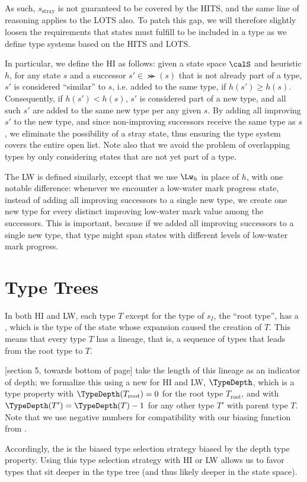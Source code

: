As such, $s_\text{stray}$ is not guaranteed to be covered by the HITS, and the same line of reasoning applies to the LOTS also. To patch this gap, we will therefore slightly loosen the requirements that states must fulfill to be included in a type as we define type systems based on the HITS and LOTS.

In particular, we define the  HI as follows: given a state space $\calS$ and heuristic $h$, for any state $s$ and a successor $s'\in\Succ(s)$ that is not already part of a type, $s'$ is considered ``similar'' to $s$, i.e. added to the same type, if $h(s')\geq h(s)$. Consequently, if $h(s')<h(s)$, $s'$ is considered part of a new type, and all such $s'$ are added to the same new type per any given $s$. By adding all improving $s'$ to the new type, and since non-improving successors receive the same type as $s$, we eliminate the possibility of a stray state, thus ensuring the type system covers the entire open list. Note also that we avoid the problem of overlapping types by only considering states that are not yet part of a type.

The  LW is defined similarly, except that we use $\Lw_h$ in place of $h$, with one notable difference: whenever we encounter a low-water mark progress state, instead of adding all improving successors to a single new type, we create one new type for every distinct improving low-water mark value among the successors. This is important, because if we added all improving successors to a single new type, that type might span states with different levels of low-water mark progress.

\section{Type Trees}
\label{sec:typetrees}

In both HI and LW, each type $T$ except for the type of $s_I$, the ``root type'', has a , which is the type of the state whose expansion caused the creation of $T$. This means that every type $T$ has a lineage, that is, a sequence of types that leads from the root type to $T$.

[section 5, towards bottom of page] take the length of this lineage as an indicator of depth; we formalize this using a new  for HI and LW, $\TypeDepth$, which is a type property with $\TypeDepth(T_\text{root})=0$ for the root type $T_\text{root}$, and with $\TypeDepth(T')=\TypeDepth(T)-1$ for any other type $T'$ with parent type $T$. Note that we use negative numbers for compatibility with our biasing function from .

Accordingly, the  is the biased type selection strategy biased by the depth type property. Using this type selection strategy with HI or LW allows us to favor types that sit deeper in the type tree (and thus likely deeper in the state space).
